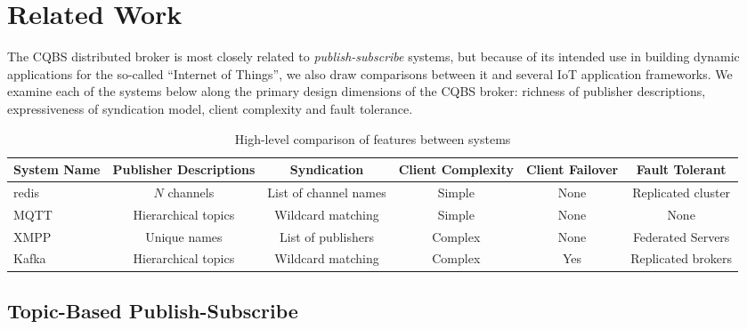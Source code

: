 \section{Related Work}


The CQBS distributed broker is most closely related to \emph{publish-subscribe} systems, but because of its intended use in building dynamic applications for the so-called ``Internet of Things'', we also draw comparisons between it and several IoT application frameworks.
We examine each of the systems below along the primary design dimensions of the CQBS broker: richness of publisher descriptions, expressiveness of syndication model, client complexity and fault tolerance.

\begin{table*}
\caption{High-level comparison of features between systems}
\label{table:comparison}
\centering
\begin{tabular}{|l|c|c|c|c|c|}
\hline
\textbf{System Name} & \textbf{Publisher Descriptions} & \textbf{Syndication} & \textbf{Client Complexity} & \textbf{Client Failover} & \textbf{Fault Tolerant} \\
\hline \hline
redis~\cite{redis} & $N$ channels & List of channel names & Simple & None & Replicated cluster \\
MQTT~\cite{locke2010mq}\cite{hunkeler2008mqtt} & Hierarchical topics & Wildcard matching & Simple & None & None \\
XMPP~\cite{saint2011extensible} & Unique names & List of publishers & Complex & None & Federated Servers \\
Kafka~\cite{kreps2011kafka} & Hierarchical topics & Wildcard matching & Complex & Yes & Replicated brokers \\
\hline
\end{tabular}
\end{table*}

\subsection{Topic-Based Publish-Subscribe}

